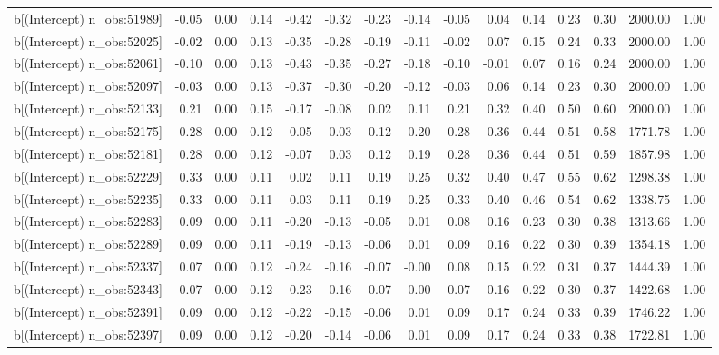 \begin{table}[ht]
\begin{tabular}{rrrrrrrrrrrrrrr}
  b[(Intercept) n\_obs:51989] & -0.05 & 0.00 & 0.14 & -0.42 & -0.32 & -0.23 & -0.14 & -0.05 & 0.04 & 0.14 & 0.23 & 0.30 & 2000.00 & 1.00 \\ 
  b[(Intercept) n\_obs:52025] & -0.02 & 0.00 & 0.13 & -0.35 & -0.28 & -0.19 & -0.11 & -0.02 & 0.07 & 0.15 & 0.24 & 0.33 & 2000.00 & 1.00 \\ 
  b[(Intercept) n\_obs:52061] & -0.10 & 0.00 & 0.13 & -0.43 & -0.35 & -0.27 & -0.18 & -0.10 & -0.01 & 0.07 & 0.16 & 0.24 & 2000.00 & 1.00 \\ 
  b[(Intercept) n\_obs:52097] & -0.03 & 0.00 & 0.13 & -0.37 & -0.30 & -0.20 & -0.12 & -0.03 & 0.06 & 0.14 & 0.23 & 0.30 & 2000.00 & 1.00 \\ 
  b[(Intercept) n\_obs:52133] & 0.21 & 0.00 & 0.15 & -0.17 & -0.08 & 0.02 & 0.11 & 0.21 & 0.32 & 0.40 & 0.50 & 0.60 & 2000.00 & 1.00 \\ 
  b[(Intercept) n\_obs:52175] & 0.28 & 0.00 & 0.12 & -0.05 & 0.03 & 0.12 & 0.20 & 0.28 & 0.36 & 0.44 & 0.51 & 0.58 & 1771.78 & 1.00 \\ 
  b[(Intercept) n\_obs:52181] & 0.28 & 0.00 & 0.12 & -0.07 & 0.03 & 0.12 & 0.19 & 0.28 & 0.36 & 0.44 & 0.51 & 0.59 & 1857.98 & 1.00 \\ 
  b[(Intercept) n\_obs:52229] & 0.33 & 0.00 & 0.11 & 0.02 & 0.11 & 0.19 & 0.25 & 0.32 & 0.40 & 0.47 & 0.55 & 0.62 & 1298.38 & 1.00 \\ 
  b[(Intercept) n\_obs:52235] & 0.33 & 0.00 & 0.11 & 0.03 & 0.11 & 0.19 & 0.25 & 0.33 & 0.40 & 0.46 & 0.54 & 0.62 & 1338.75 & 1.00 \\ 
  b[(Intercept) n\_obs:52283] & 0.09 & 0.00 & 0.11 & -0.20 & -0.13 & -0.05 & 0.01 & 0.08 & 0.16 & 0.23 & 0.30 & 0.38 & 1313.66 & 1.00 \\ 
  b[(Intercept) n\_obs:52289] & 0.09 & 0.00 & 0.11 & -0.19 & -0.13 & -0.06 & 0.01 & 0.09 & 0.16 & 0.22 & 0.30 & 0.39 & 1354.18 & 1.00 \\ 
  b[(Intercept) n\_obs:52337] & 0.07 & 0.00 & 0.12 & -0.24 & -0.16 & -0.07 & -0.00 & 0.08 & 0.15 & 0.22 & 0.31 & 0.37 & 1444.39 & 1.00 \\ 
  b[(Intercept) n\_obs:52343] & 0.07 & 0.00 & 0.12 & -0.23 & -0.16 & -0.07 & -0.00 & 0.07 & 0.16 & 0.22 & 0.30 & 0.37 & 1422.68 & 1.00 \\ 
  b[(Intercept) n\_obs:52391] & 0.09 & 0.00 & 0.12 & -0.22 & -0.15 & -0.06 & 0.01 & 0.09 & 0.17 & 0.24 & 0.33 & 0.39 & 1746.22 & 1.00 \\ 
  b[(Intercept) n\_obs:52397] & 0.09 & 0.00 & 0.12 & -0.20 & -0.14 & -0.06 & 0.01 & 0.09 & 0.17 & 0.24 & 0.33 & 0.38 & 1722.81 & 1.00 \\ 

\end{tabular}
\end{table}
